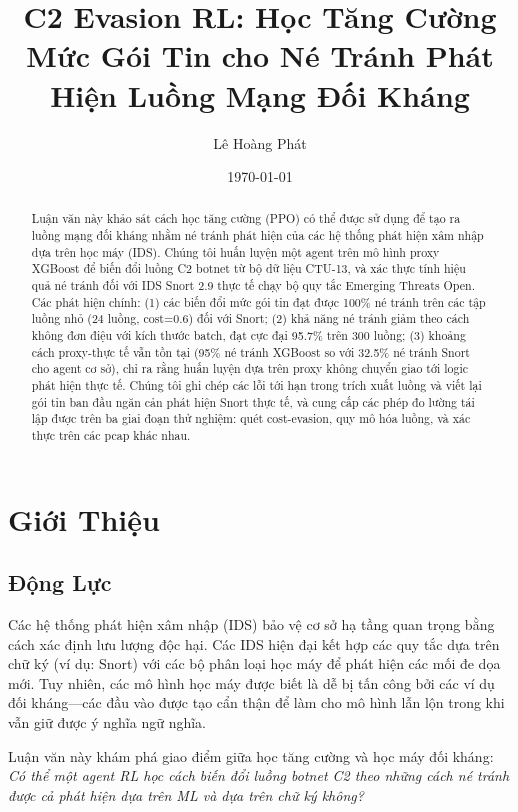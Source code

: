 \documentclass[12pt,a4paper]{report}
\title{C2 Evasion RL: Học Tăng Cường Mức Gói Tin cho Né Tránh Phát Hiện Luồng Mạng Đối Kháng}
\author{Lê Hoàng Phát}
\date{\today}
\begin{document}
\maketitle

\begin{abstract}
Luận văn này khảo sát cách học tăng cường (PPO) có thể được sử dụng để tạo ra luồng mạng đối kháng nhằm né tránh phát hiện của các hệ thống phát hiện xâm nhập dựa trên học máy (IDS). Chúng tôi huấn luyện một agent trên mô hình proxy XGBoost để biến đổi luồng C2 botnet từ bộ dữ liệu CTU-13, và xác thực tính hiệu quả né tránh đối với IDS Snort 2.9 thực tế chạy bộ quy tắc Emerging Threats Open. Các phát hiện chính: (1) các biến đổi mức gói tin đạt được 100\% né tránh trên các tập luồng nhỏ (24 luồng, cost=0.6) đối với Snort; (2) khả năng né tránh giảm theo cách không đơn điệu với kích thước batch, đạt cực đại 95.7\% trên 300 luồng; (3) khoảng cách proxy-thực tế vẫn tồn tại (95\% né tránh XGBoost so với 32.5\% né tránh Snort cho agent cơ sở), chỉ ra rằng huấn luyện dựa trên proxy không chuyển giao tới logic phát hiện thực tế. Chúng tôi ghi chép các lỗi tới hạn trong trích xuất luồng và viết lại gói tin ban đầu ngăn cản phát hiện Snort thực tế, và cung cấp các phép đo lường tái lập được trên ba giai đoạn thử nghiệm: quét cost-evasion, quy mô hóa luồng, và xác thực trên các pcap khác nhau.
\end{abstract}

\tableofcontents

\chapter{Giới Thiệu}

\section{Động Lực}

Các hệ thống phát hiện xâm nhập (IDS) bảo vệ cơ sở hạ tầng quan trọng bằng cách xác định lưu lượng độc hại. Các IDS hiện đại kết hợp các quy tắc dựa trên chữ ký (ví dụ: Snort) với các bộ phân loại học máy để phát hiện các mối đe dọa mới. Tuy nhiên, các mô hình học máy được biết là dễ bị tấn công bởi các ví dụ đối kháng—các đầu vào được tạo cẩn thận để làm cho mô hình lẫn lộn trong khi vẫn giữ được ý nghĩa ngữ nghĩa.

Luận văn này khám phá giao điểm giữa học tăng cường và học máy đối kháng: \textit{Có thể một agent RL học cách biến đổi luồng botnet C2 theo những cách né tránh được cả phát hiện dựa trên ML và dựa trên chữ ký không?}
\end{document}
